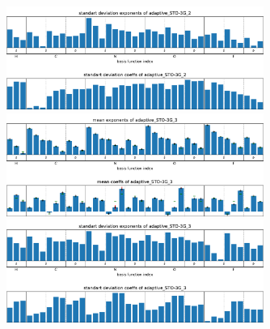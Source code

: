 \begin{figure}
    \includegraphics[width=0.75\textwidth]{chapters/results/results_images/adaptive_basis_functions/std_exps_and_coeffsadaptive_STO-3G_2}
    \includegraphics[width=0.75\textwidth]{chapters/results/results_images/adaptive_basis_functions/mean_exps_and_coeffsadaptive_STO-3G_3}
    \includegraphics[width=0.75\textwidth]{chapters/results/results_images/adaptive_basis_functions/std_exps_and_coeffsadaptive_STO-3G_3}
\end{figure}



